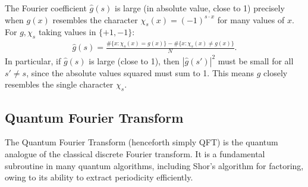 The Fourier coefficient $\hat{g}(s)$ is large (in absolute value, close to 1) precisely when $g(x)$ resembles the character $\chi_s(x) = (-1)^{s \cdot x}$ for many values of $x$. For $g, \chi_s$ taking values in $\{+1,-1\}$:
\begin{align*}
    \hat{g}(s) = \frac{\#\{x : \chi_s(x) = g(x)\} - \#\{x : \chi_s(x) \neq g(x)\}}{N}.
\end{align*}
In particular, if $\hat{g}(s)$ is large (close to 1), then $|\hat{g}(s')|^2$ must be small for all $s' \neq s$, since the absolute values squared must sum to 1. This means $g$ closely resembles the single character $\chi_s$.

\subsection{Quantum Fourier Transform}
The Quantum Fourier Transform (henceforth simply QFT) is the quantum analogue of the classical discrete Fourier transform. It is a fundamental subroutine in many quantum algorithms, including Shor's algorithm for factoring, owing to its ability to extract periodicity efficiently.

